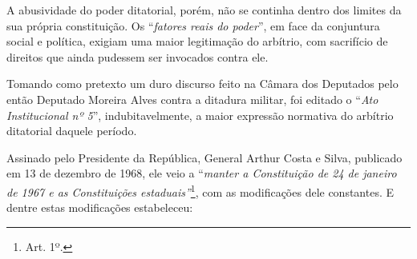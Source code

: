 A abusividade do poder ditatorial, porém, não se continha dentro dos
limites da sua própria constituição. Os ``\emph{fatores reais do
poder}'', em face da conjuntura social e política, exigiam uma maior
legitimação do arbítrio, com sacrifício de direitos que ainda pudessem
ser invocados contra ele.

Tomando como pretexto um duro discurso feito na Câmara dos Deputados
pelo então Deputado Moreira Alves contra a ditadura militar, foi editado
o ``\emph{Ato Institucional nº 5}'', indubitavelmente, a maior expressão
normativa do arbítrio ditatorial daquele período.

Assinado pelo Presidente da República, General Arthur Costa e Silva,
publicado em 13 de dezembro de 1968, ele veio a ``\emph{manter a
Constituição de 24 de janeiro de 1967 e as Constituições
estaduais''}\footnote{Art. 1º.}, com as modificações dele constantes. E
dentre estas modificações estabeleceu:

